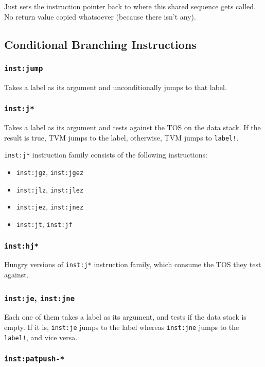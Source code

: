 \documentclass{article}
\newcommand{\inst}[1] {\texttt{inst:#1}}
\begin{document}
Just sets the instruction pointer back to where this shared sequence gets called. No return value copied whatsoever (because there isn't any).

\subsection{Conditional Branching Instructions}

\subsubsection{\inst{jump}}

Takes a label as its argument and unconditionally jumps to that label.

\subsubsection{\inst{j*}}

Takes a label as its argument and tests against the TOS on the data stack. If the result is true, TVM jumps to the label, otherwise, TVM jumps to \texttt{label!}.

\inst{j*} instruction family consists of the following instructions:
\begin{itemize}
\item \inst{jgz}, \inst{jgez}
\item \inst{jlz}, \inst{jlez}
\item \inst{jez}, \inst{jnez}
\item \inst{jt}, \inst{jf}
\end{itemize}

\subsubsection{\inst{hj*}}

Hungry versions of \inst{j*} instruction family, which consume the TOS they test against.

\subsubsection{\inst{je}, \inst{jne}}

Each one of them takes a label as its argument, and tests if the data stack is empty. If it is, \inst{je} jumps to the label whereas \inst{jne} jumps to the \texttt{label!}, and vice versa.

\subsubsection{\inst{patpush-*}}
\end{document}
